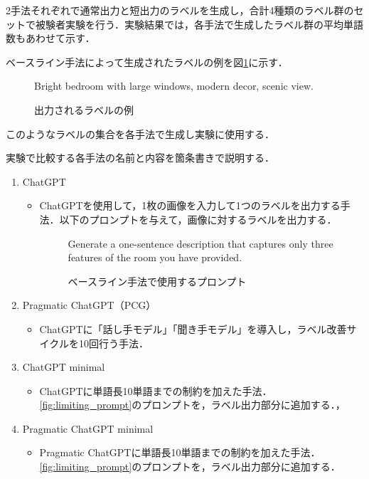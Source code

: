 \documentclass[a4paper,11pt]{jreport}
\begin{document}
2手法それぞれで通常出力と短出力のラベルを生成し，合計4種類のラベル群のセットで被験者実験を行う．実験結果では，各手法で生成したラベル群の平均単語数もあわせて示す．

ベースライン手法によって生成されたラベルの例を図\ref{fig:label_example}に示す．

\begin{figure}[H]
\begin{mdframed}[linewidth=1pt]
Bright bedroom with large windows, modern decor, scenic view.
\end{mdframed}
\caption{出力されるラベルの例}
\label{fig:label_example}
\end{figure}

このようなラベルの集合を各手法で生成し実験に使用する．

実験で比較する各手法の名前と内容を箇条書きで説明する．

\begin{enumerate}
  \item ChatGPT
  \begin{itemize}
  \item ChatGPTを使用して，1枚の画像を入力して1つのラベルを出力する手法．以下のプロンプトを与えて，画像に対するラベルを出力する．
  \begin{figure}[H]
    \begin{mdframed}[linewidth=1pt]
      Generate a one-sentence description that captures only three features of the room you have provided.
    \end{mdframed}
    \caption{ベースライン手法で使用するプロンプト}
    \label{fig:baseline_prompt}
  \end{figure}
\end{itemize}
  
  \item Pragmatic ChatGPT（PCG）
  \begin{itemize}
    \item ChatGPTに「話し手モデル」「聞き手モデル」を導入し，ラベル改善サイクルを10回行う手法．
  \end{itemize}
    
  \item ChatGPT minimal
  \begin{itemize}
    \item ChatGPTに単語長10単語までの制約を加えた手法．\ref{fig:limiting_prompt}のプロンプトを，ラベル出力部分に追加する．，
  \end{itemize}
  
  \item Pragmatic ChatGPT minimal
  \begin{itemize}
    \item Pragmatic ChatGPTに単語長10単語までの制約を加えた手法．\ref{fig:limiting_prompt}のプロンプトを，ラベル出力部分に追加する．
  \end{itemize}
  
\end{enumerate}
\end{document}
